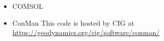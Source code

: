 \begin{itemize}
\item {\codefont COMSOL} 

\begin{scriptsize}
\cite{vack08}
\cite{ronb12}
\cite{cuwi14}
\cite{paml14b}
\end{scriptsize}

\item {\codefont ConMan} 
This code is hosted by CIG at \url{https://geodynamics.org/cig/software/conman/}


\end{itemize}
